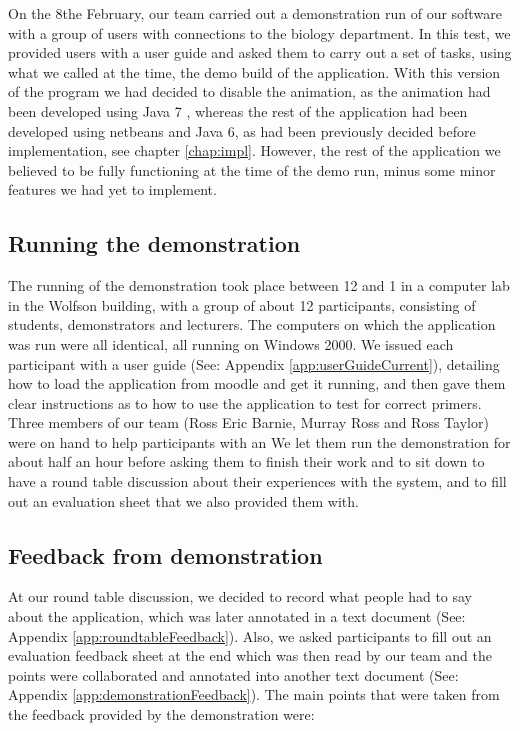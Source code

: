 On the 8the February, our team carried out a demonstration run of our software with a group of users with connections to the biology department. In this test, we provided users with a user guide and asked them to carry out a set of tasks, using what we called at the time, the demo build of the application. With this version of the program we had decided to disable the animation, as the animation had been developed using Java 7 \cite{Java7SwingAPI}, whereas the rest of the application had been developed using netbeans and Java 6, as had been previously decided before implementation, see chapter \ref{chap:impl}. However, the rest of the application we believed to be fully functioning at the time of the demo run, minus some minor features we had yet to implement.

\subsection{Running the demonstration}

The running of the demonstration took place between 12 and 1 in a computer lab in the Wolfson building, with a group of about 12 participants, consisting of students, demonstrators and lecturers. The computers on which the application was run were all identical, all running on Windows 2000. We issued each participant with a user guide (See: Appendix \ref{app:userGuideCurrent}), detailing how to load the application from moodle and get it running, and then gave them clear instructions as to how to use the application to test for correct primers. Three members of our team (Ross Eric Barnie, Murray Ross and Ross Taylor) were on hand to help participants with an We let them run the demonstration for about half an hour before asking them to finish their work and to sit down to have a round table discussion about their experiences with the system, and to fill out an evaluation sheet that we also provided them with.

\subsection{Feedback from demonstration}

At our round table discussion, we decided to record what people had to say about the application, which was later annotated in a text document (See: Appendix \ref{app:roundtableFeedback}). Also, we asked participants to fill out an evaluation feedback sheet at the end which was then read by our team and the points were collaborated and annotated into another text document (See: Appendix \ref{app:demonstrationFeedback}). The main points that were taken from the feedback provided by the demonstration were:


